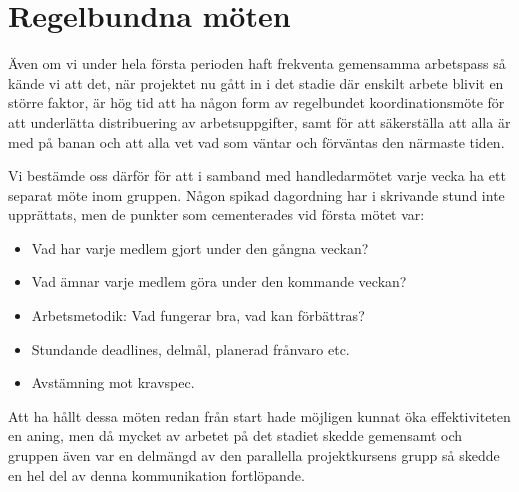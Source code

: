 \section{Regelbundna möten}
Även om vi under hela första perioden haft frekventa gemensamma arbetspass så kände vi att det, när projektet nu gått in i det stadie där enskilt arbete blivit en större faktor, är hög tid att ha någon form av regelbundet koordinationsmöte för att underlätta distribuering av arbetsuppgifter, samt för att säkerställa att alla är med på banan och att alla vet vad som väntar och förväntas den närmaste tiden.

Vi bestämde oss därför för att i samband med handledarmötet varje vecka ha ett separat möte inom gruppen. Någon spikad dagordning har i skrivande stund inte upprättats, men de punkter som cementerades vid första mötet var:
\begin{itemize}
\item Vad har varje medlem gjort under den gångna veckan?
\item Vad ämnar varje medlem göra under den kommande veckan?
\item Arbetsmetodik: Vad fungerar bra, vad kan förbättras?
\item Stundande deadlines, delmål, planerad frånvaro etc.
\item Avstämning mot kravspec.
\end{itemize}

Att ha hållt dessa möten redan från start hade möjligen kunnat öka effektiviteten en aning, men då mycket av arbetet på det stadiet skedde gemensamt och gruppen även var en delmängd av den parallella projektkursens grupp så skedde en hel del av denna kommunikation fortlöpande.
